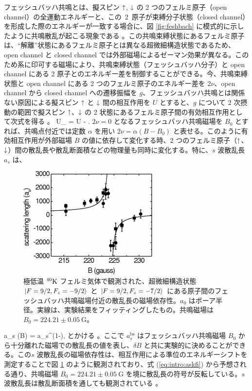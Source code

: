 フェッシュバッハ共鳴とは、擬スピン $\uparrow$, $\downarrow$ の 2 つのフェルミ原子（open channel）の全運動エネルギーと、この~2~原子が束縛分子状態（closed channel）を形成した際のエネルギーが一致する場合に、図 \ref{fig:feshbach} に模式的に示したように共鳴散乱が起こる現象である \cite{feshbach1962}。この共鳴束縛状態にあるフェルミ原子は、“解離”状態にあるフェルミ原子とは異なる超微細構造状態であるため、open channel と closed channel では外部磁場によるゼーマン効果が異なる。このため系に印可する磁場により、共鳴束縛状態（フェッシュバッハ分子）と open channel にある 2 原子とのエネルギー差を制御することができる。今、共鳴束縛状態と open channel にある 2 つのフェルミ原子のエネルギー差を $2 \nu$、open channel から closed channel への遷移振幅を $g$、フェッシュバッハ共鳴とは関係ない原因による擬スピン $\uparrow$ と $\downarrow$ 間の相互作用を $U$ とすると、$g$ について 2 次摂動の範囲で擬スピン $\uparrow$、$\downarrow$ の 2 状態にあるフェルミ原子間の有効相互作用として次式を得る \cite{ohashi2005}。
\beq
U_{} = U - .\label{eq:intro:ueff}
\eeq
$2\nu=0$ となるフェッシュバッハ共鳴磁場を $B_0$ とすれば、共鳴点付近では定数 $\alpha$ を用い $2 \nu = \alpha (B-B_0)$ と表せる。このように有効相互作用が外部磁場 $B$ の値に依存して変化する時、2 つのフェルミ原子（$\uparrow$、$\downarrow$）間の散乱長や散乱断面積などの物理量も同時に変化する。特に、$s$ 波散乱長 $a_s$ は、
\begin{figure}[t]
\centering
\includegraphics[width=70mm]{eps/medium.eps}
\caption{極低温 ${}^{40}\mathrm{K}$ フェルミ気体で観測された、超微細構造状態 $\ket{F=9/2,F_z=-9/2}$ と $\ket{F=9/2, F_z=-7/2}$ にある原子間のフェッシュバッハ共鳴磁場付近の散乱長の磁場依存性\cite{regal2003}。$a_0$ はボーア半径。実線は、実験結果をフィッティングしたもの。共鳴磁場は $B_0=224.21\pm0.05\  \text{G}$。}
\label{fig:sscatter}
\end{figure}
\beq
a_s (B) = a_s^{}\left(1-\right),\label{eq:intro:askfi}
\eeq
とかける \cite{pethick2008}。ここで $a_s^{\text{bs}}$ はフェッシュバッハ共鳴磁場 $B_0$ から十分離れた磁場での散乱長の値を表し、$\delta B$ と共に実験的に決めることができる。この$s$ 波散乱長の磁場依存性は、相互作用による準位のエネルギーシフトを測定することで図 \ref{fig:sscatter} のように観測されており、式 (\ref{eq:intro:askfi}) から予想される通り、共鳴磁場 $B_0=224.21\pm0.05\  \text{G}$ を境に散乱長の符号が反転している。$s$ 波散乱長は散乱断面積を通しても観測されている \cite{loftus2002}。

